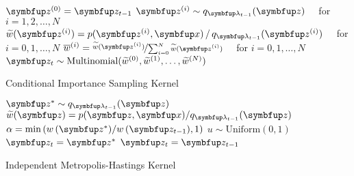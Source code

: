 \begin{center}
\begin{minipage}[c]{0.7\textwidth}%
  \begin{algorithm2e}[H]
    \DontPrintSemicolon
    \SetAlgoLined
    \(\vz^{(0)} = \vz_{t-1}\) \;
    \(\vz^{(i)} \sim q_{\vlambda_{t-1}}(\vz)\quad\) for \(i = 1, 2,\ldots, N\) \;
    \(\widetilde{w}(\vz^{(i)}) = p(\vz^{(i)},\vx) \,/\, q_{\vlambda_{t-1}}(\vz^{(i)})\quad\) for \(i = 0, 1,\ldots, N\)\;
    \(\overline{w}^{(i)} = \nicefrac{\widetilde{w}(\vz^{(i)})}{ \sum^{N}_{i=0} \widetilde{w}(\vz^{(i)}) }\quad\) for \(i = 0, 1,\ldots, N\)\;
    \(\vz_{t} \sim \mathrm{Multinomial}(\widetilde{w}^{(0)}, \widetilde{w}^{(1)}, \ldots, \widetilde{w}^{(N)}) \)\;
    \caption{Conditional Importance Sampling Kernel}
  \end{algorithm2e}
\end{minipage}

\begin{minipage}[c]{0.7\textwidth}%
  \begin{algorithm2e}[H]
    \DontPrintSemicolon
    \SetAlgoLined
    \(\vz^* \sim q_{\vlambda_{t-1}}(\vz)\)\;
    \(\widetilde{w}(\vz) = p(\vz,\vx)/q_{\vlambda_{t-1}}(\vz) \)\;
    \(\alpha = \min\left( w\,(\vz^*)/w\,(\vz_{t-1}), 1\right)\)\;
    \(u \sim \mathrm{Uniform}(0, 1) \)\;
        {
          \(\vz_t = \vz^*\)
        }
        {
          \(\vz_t = \vz_{t-1}\)
        }
        \caption{Independent Metropolis-Hastings Kernel}
  \end{algorithm2e}
\end{minipage}

\end{center}

